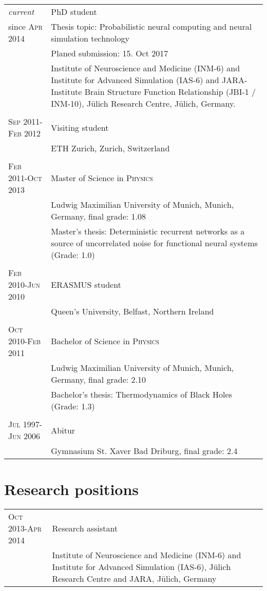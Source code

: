 \documentclass[a4paper,10pt]{article}
\begin{document}
\begin{longtable}{>{\hfill}p{3.15cm}|p{10.4cm}}
  \emph{current} & PhD student \\
  since \textsc{Apr 2014}& \footnotesize Thesis topic: Probabilistic neural computing and neural simulation technology \\
  & \footnotesize Planed submission: 15. Oct 2017 \\
  & \footnotesize Institute of Neuroscience and Medicine (INM-6) and Institute for Advanced Simulation (IAS-6) and JARA-Institute Brain Structure Function Relationship (\mbox{JBI-1} / INM-10), J\"ulich Research Centre, J\"ulich, Germany. \\
  \multicolumn{2}{c}{} \\
  \textsc{Sep} 2011-\textsc{Feb} 2012 & Visiting student \\
  & \footnotesize{ETH Zurich, Zurich, Switzerland} \\
  \multicolumn{2}{c}{} \\
  \textsc{Feb} 2011-\textsc{Oct} 2013 & Master of Science in \textsc{Physics} \\
  & \footnotesize Ludwig Maximilian University of Munich, Munich, Germany, final grade: 1.08 \\
  & \footnotesize Master's thesis: Deterministic recurrent networks as
  a source of uncorrelated noise for
  functional neural systems (Grade: 1.0) \\
  \multicolumn{2}{c}{} \\
  \textsc{Feb} 2010-\textsc{Jun} 2010 & ERASMUS student \\
  & \footnotesize Queen's University, Belfast, Northern Ireland \\
  \multicolumn{2}{c}{} \\
  \textsc{Oct} 2010-\textsc{Feb} 2011 & Bachelor of Science in \textsc{Physics} \\
  & \footnotesize Ludwig Maximilian University of Munich, Munich, Germany, final grade: 2.10 \\
  & \footnotesize Bachelor's thesis: Thermodynamics of Black Holes (Grade: 1.3) \\
  \multicolumn{2}{c}{} \\
  \textsc{Jul} 1997-\textsc{Jun} 2006 & Abitur \\
  & \footnotesize Gymnasium St. Xaver Bad Driburg, final grade: 2.4
\end{longtable}

\section{Research positions}
\begin{longtable}{>{\hfill}p{3.15cm}|p{10.4cm}}
\textsc{Oct} 2013-\textsc{Apr} 2014 & Research assistant \\
& \footnotesize Institute of Neuroscience and Medicine (INM-6) and Institute for Advanced Simulation (IAS-6), J\"ulich Research Centre and JARA, J\"ulich, Germany\\
\end{longtable}
\end{document}
